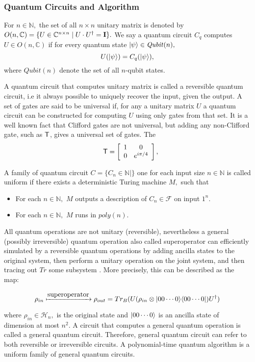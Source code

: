 \subsubsection{Quantum Circuits and Algorithm}
For $n\in \mathbb{N},$ the set of all $n\times n$ unitary matrix is denoted by $O(n,\mathbb{C})=\{U\in \mathbb{C}^{n\times n} \mid U\cdot U^\dagger={\bf I}\}.$ We say a quantum circuit $C_q$ computes $U\in O(n,\mathbb{C})$ if for every quantum state ${\lvert}\psi\rangle \in \mathit{Qubit}(n),$
$$U({\lvert}\psi\rangle )=C_q({\lvert}\psi\rangle),$$
where  $\mathit{Qubit}(n)$  denote the set of all $n$-qubit states.

A quantum circuit that computes unitary matrix is called a reversible  quantum circuit, i.e it always possible to uniquely recover the input, given the output. A set of gates are said to be universal if, for any a unitary matrix $U$  a quantum circuit can be constructed for computing $U$ using only gates from that set. It is a well known fact that Clifford gates are not universal, but adding any non-Clifford gate, such as ${\sf T}$, gives a universal set of gates. The
$$\quad{\sf T} = \left[\begin{array}{cc} 1 & 0\\ 0 & e^{i\pi/4}\end{array}\right],$$

A family of quantum circuit $C=\{C_n\in \mathbb{N} \mid \}$ one for each input  size $n\in \mathbb{N}$ is called uniform if there exists a deterministic Turing machine $M,$ such that
 \begin{itemize}
 \item For each $n\in\mathbb{N},$ $M$ outputs a description of $C_n \in \mathcal{F}$ on input $1^n.$
 \item  For each $n\in\mathbb{N},$ $M$ runs in $poly(n).$
 \end{itemize}

All quantum operations are not unitary (reversible), nevertheless a general (possibly irreversible) quantum operation also called superoperator can efficiently simulated by a reversible quantum operations by adding ancilla states to the original system, then perform a unitary operation on the joint system, and then tracing out $Tr$ some subsystem \cite{}. More precisely, this can be described as the map:

$$\rho_{in} \xmapsto{\mbox{superoperator}} \rho_{out}=Tr_B(U(\rho_{in} \otimes {\lvert}00\cdots 0\rangle {\langle}00\cdots 0\rvert)U^\dagger)$$

where $\rho_{in} \in \mathcal{H}_n,$ is the original state and ${\lvert}00\cdots 0\rangle$ is an ancilla state of dimension at most $n^2.$ A circuit that computes a general quantum operation is called a general quantum circuit.  Therefore, general quantum circuit can refer to both reversible or irreversible circuits. A polynomial-time quantum algorithm is a uniform family of general quantum circuits. \\

